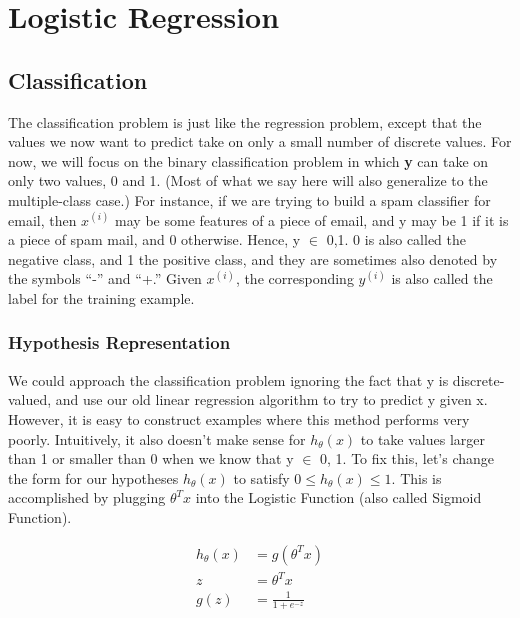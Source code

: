 \chapter{Logistic Regression}

\section{Classification}

The classification problem is just like the regression problem, except that the values we now want to predict take on only a small number of discrete values. For now, we will focus on the binary classification problem in which \textbf{y} can take on only two values, 0 and 1. (Most of what we say here will also generalize to the multiple-class case.) For instance, if we are trying to build a spam classifier for email, then $ x^{(i)} $ may be some features of a piece of email, and y may be 1 if it is a piece of spam mail, and 0 otherwise. Hence, y $\in$ {0,1}. 0 is also called the negative class, and 1 the positive class, and they are sometimes also denoted by the symbols “-” and “+.” Given $ x^{(i)} $, the corresponding $ y^{(i)} $ is also called the label for the training example.

\subsection{Hypothesis Representation}

We could approach the classification problem ignoring the fact that y is discrete-valued, and use our old linear regression algorithm to try to predict y given x. However, it is easy to construct examples where this method performs very poorly. Intuitively, it also doesn’t make sense for $ h_\theta (x) $ to take values larger than 1 or smaller than 0 when we know that y $\in$ {0, 1}. To fix this, let’s change the form for our hypotheses $ h_\theta (x) $ to satisfy $ 0 \leq h_\theta (x) \leq 1 $. This is accomplished by plugging $ \theta^Tx $ into the Logistic Function (also called Sigmoid Function).\\


\begin{tcolorbox}[width=\textwidth,colback={white},colbacktitle=white]
\begin{align*}
h_\theta(x) &=g(\theta^Tx)\\
z &=\theta^Tx\\
g(z) &=\frac{1}{1+e^{-z}}
\end{align*}
\end{tcolorbox} 

